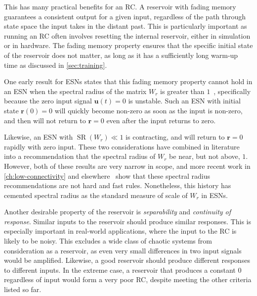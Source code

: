 This has many practical benefits for an RC. A reservoir with fading
memory guarantees a consistent output for a given input, regardless of
the path through state space the input takes in the distant past. This
is particularly important as running an RC often involves
resetting the internal reservoir, either in simulation or in
hardware. The fading memory property ensures that the specific initial
state of the reservoir does not matter, as long as it has a
sufficiently long warm-up time as discussed in \cref{sec:training}.

One early result for ESNs states that this fading memory property
cannot hold in an ESN when the spectral radius of the matrix $W_r$ is
greater than $1$~\cite{jaeger2001}, specifically because the zero
input signal $\bm{u}(t) = 0$ is unstable. Such an ESN with initial
state $\bm{r}(0) = 0$ will quickly become non-zero as soon as the
input is non-zero, and then will not return to $\bm{r} = 0$ even after
the input returns to zero.

Likewise, an ESN with $\operatorname{SR}(W_r) \ll 1$ is contracting,
and will return to $\bm{r} = 0$ rapidly with zero input. These two
considerations have combined in literature into a recommendation that
the spectral radius of $W_r$ be near, but not above,
$1$.~\cite{lukosevicius2012} However, both of these results are very
narrow in scope, and more recent work in \cref{ch:low-connectivity}
and elsewhere~\cite{pathak2017,rodan2011} show that these spectral
radius recommendations are not hard and fast rules. Nonetheless, this
history has cemented spectral radius as the standard measure of scale
of $W_r$ in ESNs.

Another desirable property of the reservoir is \emph{separability} and
\emph{continuity of response}. Similar inputs to the reservoir should produce
similar responses. This is especially important in real-world
applications, where the input to the RC is likely to be noisy. This
excludes a wide class of chaotic systems from consideration as a
reservoir, as even very small differences in two input signals would
be amplified. Likewise, a good reservoir should produce different
responses to different inputs. In the extreme case, a reservoir that
produces a constant $0$ regardless of input would form a very poor RC,
despite meeting the other criteria listed so far.

